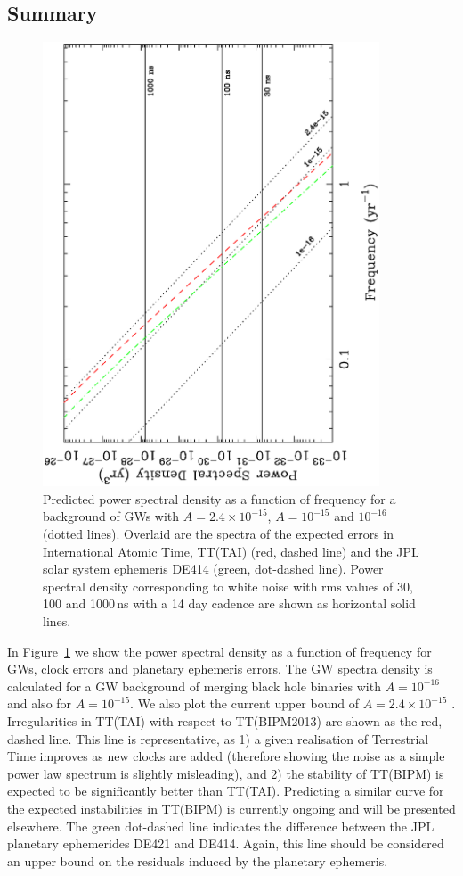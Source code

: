 \documentclass{raa}            %
\begin{document}
\subsection{Summary}

\begin{figure}
\begin{center}
\includegraphics[angle=-90,width=10cm]{spectra1.ps}
\caption{Predicted power spectral density as a function of frequency for a background of GWs with $A = 2.4 \times 10^{-15}$, $A = 10^{-15}$ and $10^{-16}$ (dotted lines). Overlaid are the spectra of the expected errors in International Atomic Time, TT(TAI) (red, dashed line) and the JPL solar system ephemeris DE414 (green, dot-dashed line).  Power spectral density corresponding to white noise with rms values of 30, 100 and 1000\,ns with a 14 day cadence are shown as horizontal solid lines.} \label{fg:spectra1}
\end{center}
\end{figure}

In Figure~\ref{fg:spectra1} we show the power spectral density as a function of frequency for GWs, clock errors and planetary ephemeris errors.  The GW spectra density is calculated for a GW background of merging black hole binaries with $A = 10^{-16}$ and also for $A = 10^{-15}$. We also plot the current upper bound of $A = 2.4 \times 10^{-15}$ \citep{src+13}.  Irregularities in TT(TAI) with respect to TT(BIPM2013) are shown as the red, dashed line.  This line is representative, as 1) a given realisation of Terrestrial Time improves as new clocks are added (therefore showing the noise as a simple power law spectrum is slightly misleading), and 2) the stability of TT(BIPM) is expected to be significantly better than TT(TAI).  Predicting a similar curve for the expected instabilities in TT(BIPM) is currently ongoing and will be presented elsewhere.  The green dot-dashed line indicates the difference between the JPL planetary ephemerides DE421 and DE414.  Again, this line should be considered an upper bound on the residuals induced by the planetary ephemeris. 
\end{document}
